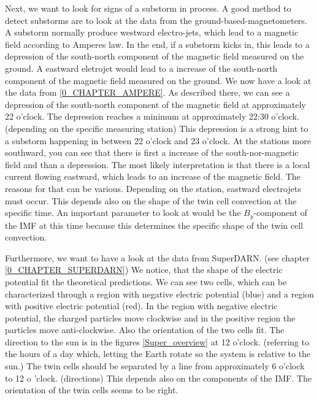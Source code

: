 \documentclass[10pt,a4paper]{article}
\begin{document}
Next, we want to look for signs of a substorm in process. A good method to detect substorms are to look at the data from the ground-based-magnetometers. A substorm 
normally produce westward electro-jets, which lead to a magnetic field according to Amperes law. In the end, if a substorm kicks in, this leads to a depression of the south-north component of the magnetic field measured on the ground. A eastward eletrojet would lead to a increase of the south-north component of the magnetic field measured on the ground. We now have a look at the data from \ref{0_CHAPTER_AMPERE}. As described there, we can see a depression of the south-north component of the magnetic field at approximately 22 o'clock. The depression reaches a minimum at approximately 22:30 o'clock. (depending on the specific measuring station) This depression is a strong hint to a substorm happening in between 22 o'clock and 23 o'clock. 
At the stations more southward, you can see that there is first a increase of the south-nor-magnetic field and than a depression. The most likely interpretation is that there is a local current flowing eastward, which leads to an increase of the magnetic field. The reasons for that can be various. Depending on the station, eastward electrojets must occur. This depends also on the shape of the twin cell convection at the specific time. An important parameter to look at would be the $B_y$-component of the IMF at this time because this determines the specific shape of the twin cell convection.

Furthermore, we want to have a look at the data from SuperDARN. (see chapter \ref{0_CHAPTER_SUPERDARN}) We notice, that the shape of the electric potential fit the theoretical predictions. We can see two cells, which can be characterized through a region with negative electric potential (blue) and a region with positive electric 
potential (red). In the region with negative electric potential, the charged particles move clockwise and in the positive region the particles move anti-clockwise. 
Also the orientation of the two cells fit. The direction to the sun is in the figures \ref{Super_overview} at 12 o'clock. 
(referring to the hours of a day which, letting the Earth rotate so the system is relative to the sun.) The twin cells should be separated by a line from approximately  6 o'clock to 12 o 'clock. (directions) This depends also on the components of the IMF. The orientation of the twin cells seems to be right.  
\end{document}
